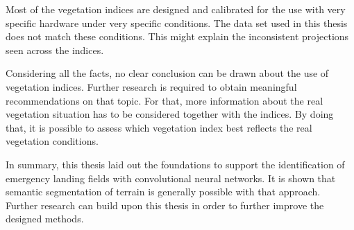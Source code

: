 Most of the vegetation indices are designed and calibrated for the use with very specific hardware under very specific conditions. The data set used in this thesis does not match these conditions.
This might explain the inconsistent projections seen across the indices.

Considering all the facts, no clear conclusion can be drawn about the use of vegetation indices. Further research is required to obtain meaningful recommendations on that topic. For that, more information about the real vegetation situation has to be considered together with the indices. By doing that, it is possible to assess which vegetation index best reflects the real vegetation conditions.

In summary, this thesis laid out the foundations to support the identification of emergency landing fields with convolutional neural networks. It is shown that semantic segmentation of terrain is generally possible with that approach. Further research can build upon this thesis in order to further improve the designed methods.

\newpage